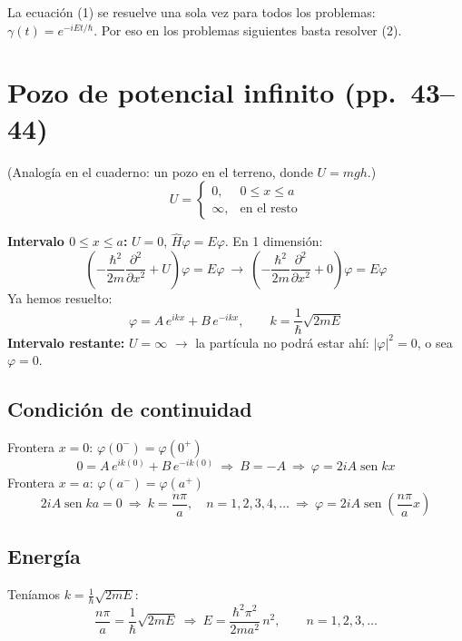 \documentclass[11pt,a4paper]{article}
\newcommand{\pags}[1]{{\normalfont\small\color{gris}(pp.~#1)}}
\DeclareMathOperator{\sen}{sen}
\begin{document}
\begin{obs}
La ecuación (1) se resuelve una sola vez para todos los problemas: $\gamma(t)=e^{-iEt/\hbar}$. Por eso en los problemas
siguientes basta resolver (2).
\end{obs}

\section{Pozo de potencial infinito \pags{43--44}}

(Analogía en el cuaderno: un pozo en el terreno, donde $U=mgh$.)
\[
U=\begin{cases}0, & 0\le x\le a\\ \infty, & \text{en el resto}\end{cases}
\]

\textbf{Intervalo $0\le x\le a$:} $U=0$, $\hat H\varphi=E\varphi$. En 1 dimensión:
\[
\left(-\frac{\hbar^2}{2m}\frac{\partial^2}{\partial x^2}+U\right)\varphi=E\varphi
\ \rightarrow\
\left(-\frac{\hbar^2}{2m}\frac{\partial^2}{\partial x^2}+0\right)\varphi=E\varphi
\]
Ya hemos resuelto:
\[
\varphi=A\,e^{ikx}+B\,e^{-ikx},\qquad k=\frac1\hbar\sqrt{2mE}
\]
\textbf{Intervalo restante:} $U=\infty$ $\rightarrow$ la partícula no podrá estar ahí: $|\varphi|^2=0$, o sea $\varphi=0$.

\subsection{Condición de continuidad}
Frontera $x=0$: $\varphi(0^-)=\varphi(0^+)$
\[
0=A\,e^{ik(0)}+B\,e^{-ik(0)}\ \Rightarrow\ B=-A\ \Rightarrow\ \varphi=2iA\sen kx
\]
Frontera $x=a$: $\varphi(a^-)=\varphi(a^+)$
\[
2iA\sen ka=0\ \Rightarrow\ k=\frac{n\pi}{a},\quad n=1,2,3,4,\ldots
\ \Rightarrow\
\varphi=2iA\sen\!\left(\frac{n\pi}{a}x\right)
\]

\subsection{Energía}
Teníamos $k=\frac1\hbar\sqrt{2mE}$:
\[
\frac{n\pi}{a}=\frac1\hbar\sqrt{2mE}\ \Rightarrow\ \boxed{E=\frac{\hbar^2\pi^2}{2ma^2}\,n^2},\qquad n=1,2,3,\ldots
\]
\end{document}
